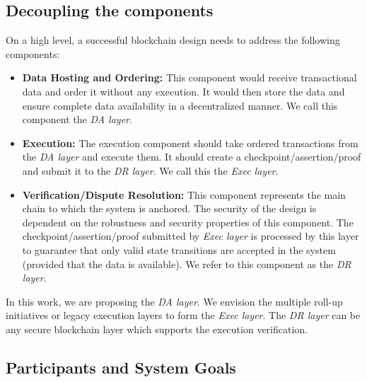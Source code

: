\documentclass[sigconf, screen=true, nonacm]{acmart}
\newcommand{\DA}{\textit{DA layer}}
\newcommand{\EX}{\textit{Exec layer}}
\newcommand{\DR}{\textit{DR layer}}
\begin{document}
    \subsection{Decoupling the components}
        On a high level, a successful blockchain design needs to address the following components:
        \begin{itemize}
            \item \textbf{Data Hosting and Ordering:} This component would receive transactional data and order it without any execution. It would then store the data and ensure complete data availability in a decentralized manner. We call this component the \DA.
            \item \textbf{Execution:} The execution component should take ordered transactions from the \DA{} and execute them. It should create a checkpoint/assertion/proof and submit it to the \DR. We call this the \EX.
            \item \textbf{Verification/Dispute Resolution:} This component represents the main chain to which the system is anchored. The security of the design is dependent on the robustness and security properties of this component. The checkpoint/assertion/\-proof submitted by \EX{} is processed by this layer to guarantee that only valid state transitions are accepted in the system (provided that the data is available). We refer to this component as the \DR. 
        \end{itemize}

        In this work, we are proposing the \DA. We envision the multiple roll-up initiatives or legacy execution layers to form the \EX. The \DR{} can be any secure blockchain layer which supports the execution verification.
    
    \subsection{Participants and System Goals}
\end{document}
